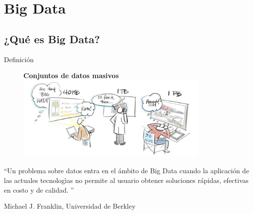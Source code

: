 
\section{Big Data}

	\subsection*{¿Qué es Big Data?}

		\begin{frame}{Definición}
			\kern-0.5cm
			\begin{figure}
				\centering
				\textbf{Conjuntos de datos masivos}
				\includegraphics[width=0.85\textwidth]{./Images/what-is-big-data.png}
			\end{figure}

			\fontsize{8}{8}\selectfont	
			\begin{tcolorbox}[colback=ChetwodeBlue!10,colframe=ChetwodeBlue!60]
				``Un problema sobre datos entra en el ámbito de Big Data cuando la aplicación de las actuales tecnologı́as no permite al usuario obtener soluciones rápidas, efectivas en costo y de calidad. ''
				\begin{flushright}
					Michael J. Franklin, Universidad de Berkley 
				\end{flushright}
			\end{tcolorbox}
			
		\end{frame}

